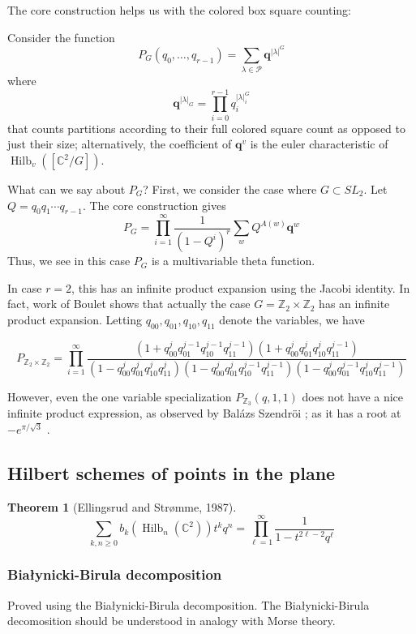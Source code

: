 \documentclass{amsart}[12pt]
\theoremstyle{definition}
\newtheorem{theorem}[dummy]{Theorem}
\newcommand{\Z}{\mathbb{Z}}
\newcommand{\C}{\mathbb{C}}
\DeclareMathOperator{\Hilb}{Hilb}
\begin{document}
The core construction helps us with the colored box square counting:

Consider the function
$$P_G(q_0,\dots,q_{r-1})=\sum_{\lambda\in\mathcal{P}} \mathbf{q}^{|\lambda|^G}$$
where 
$$\mathbf{q}^{|\lambda|_G}=\prod_{i=0}^{r-1} q_i^{|\lambda|^G_i}$$
that counts partitions according to their full colored square count as opposed to just their size; alternatively, the coefficient of $\mathbf{q}^v$ is the euler characteristic of $\Hilb_v([\C^2/G])$.

What can we say about $P_G$?  First, we consider the case where $G\subset SL_2$.  Let $Q=q_0q_1\cdots q_{r-1}$.  The core construction gives
$$P_G=\prod_{i=1}^\infty\frac{1}{(1-Q^i)^r} \sum_{w} Q^{A(w)}\mathbf{q}^w $$
Thus, we see in this case $P_G$ is a multivariable theta function.

In case $r=2$, this has an infinite product expansion using the Jacobi identity.  In fact, work of Boulet shows that actually the case $G=\Z_2\times \Z_2$ has an infinite product expansion.  Letting $q_{00}, q_{01}, q_{10}, q_{11}$ denote the variables, we have

$$P_{\Z_2\times\Z_2}=\prod_{i=1}^\infty \frac{(1+q_{00}^jq_{01}^{j-1}q_{10}^{j-1}q_{11}^{j-1})(1+q_{00}^jq_{01}^jq_{10}^jq_{11}^{j-1})}{(1-q_{00}^jq_{01}^jq_{10}^jq_{11}^j)(1-q_{00}^jq_{01}^jq_{10}^{j-1}q_{11}^{j-1})(1-q_{00}^jq_{01}^{j-1}q_{10}^{j}q_{11}^{j-1})}$$

However, even the one variable specialization $P_{\Z_3}(q,1,1)$ does not have a nice infinite product expression, as observed by Bal\'azs Szendr\"oi \cite{Bmo}; as it has a root at $-e^{\pi/\sqrt{3}}$ \cite{Borwein2}.


\subsection{Hilbert schemes of points in the plane}


\begin{theorem}[Ellingsrud and Str\o mme, 1987]
$$\sum_{k,n \geq 0} b_k(\Hilb_n(\C^2))t^k q^n=\prod_{\ell=1}^\infty \frac{1}{1-t^{2\ell-2}q^\ell}$$
\end{theorem}



\subsubsection{Bia\l ynicki-Birula decomposition}
Proved using the Bia\l ynicki-Birula decomposition.  The Bia\l ynicki-Birula decomosition should be understood in analogy with Morse theory.  
\end{document}
